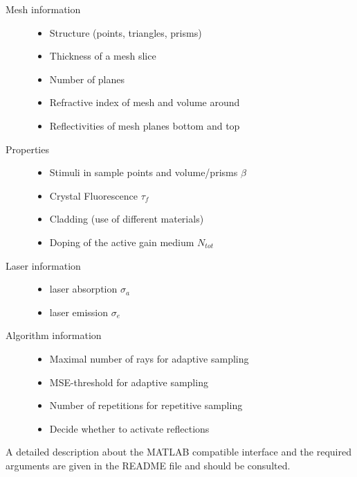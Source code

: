 \begin{description}
  \label{label:input}
  \item[Mesh information]\mbox{}
    \begin{itemize}
      \setlength{\itemindent}{-2.5em}
    \item Structure (points, triangles, prisms)
    \item Thickness of a mesh slice 
    \item Number of planes
    \item Refractive index of mesh and volume around
    \item Reflectivities of mesh planes bottom and top
    \end{itemize}

  \item[Properties]
    \mbox{}
    \begin{itemize}
      \setlength{\itemindent}{-2.5em}
      \item Stimuli in sample points and volume/prisms $\beta$
      \item Crystal Fluorescence $\tau_{f}$
      \item Cladding (use of different materials)
      \item Doping of the active gain medium $N_{tot}$
    \end{itemize}

  \item[Laser information]
    \mbox{}
    \begin{itemize}
      \setlength{\itemindent}{-2.5em}
      \item laser absorption $\sigma_a$
      \item laser emission $\sigma_e$
    \end{itemize}

   \item[Algorithm information]
    \mbox{}
    \begin{itemize}
      \setlength{\itemindent}{-2.5em}
       \item Maximal number of rays for adaptive sampling
       \item MSE-threshold for adaptive sampling
       \item Number of repetitions for repetitive sampling
       \item Decide whether to activate reflections
     \end{itemize}
    
 \end{description}
A detailed description about the MATLAB compatible interface
and the required arguments are given in the README file 
and should be consulted.

